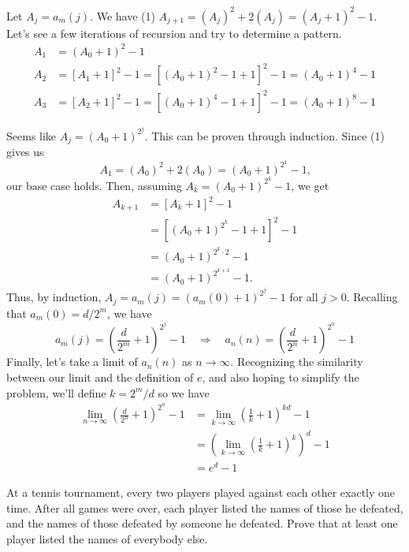 \begin{solution}[$e^d-1$]
    Let $A_j=a_m(j)$. We have (1) $A_{j+1}=(A_j)^2+2(A_j)=(A_j+1)^2-1$. Let's see a few iterations of recursion and try to determine a pattern.
    \begin{align*}
        A_{1} &= (A_0+1)^2-1\\
        A_{2} &= [A_{1}+1]^2-1=\left[(A_0+1)^2-1+1\right]^2-1 = (A_0+1)^4-1\\
        A_{3} &= [A_{2}+1]^2-1=\left[(A_0+1)^4-1+1\right]^2-1 = (A_0+1)^8-1
    \end{align*}\raggedright
    Seems like $\displaystyle A_j=(A_0+1)^{\textstyle 2^j}$. This can be proven through induction. Since (1) gives us
    \[
    A_1=(A_0)^2+2(A_0)=(A_0+1)^{\textstyle 2^1}-1\text{,}
    \]
    our base case holds. Then, assuming $\displaystyle A_k=(A_0+1)^{\textstyle 2^k}-1$, we get 
    \begin{align*}
        A_{k+1} &= [A_k+1]^2-1\\
        &= [(A_0+1)^{\textstyle 2^k}-1+1]^2-1\\
        &=(A_0+1)^{\textstyle 2^k\cdot2}-1\\
        &=(A_0+1)^{\textstyle 2^{k+1}}-1.
    \end{align*}
    Thus, by induction, $A_j=a_m(j)=(a_m(0)+1)^{\textstyle 2^j}-1$ for all $j>0$. Recalling that $a_m(0)=d/2^m$, we have
    \[
    a_m(j)=\left(\frac{d}{2^m}+1\right)^{\textstyle\!2^j}-1 \quad \Rightarrow \quad a_n(n)=\left(\frac{d}{2^n}+1\right)^{\textstyle\!2^n}-1
    \]
    Finally, let's take a limit of $a_n(n)$ as $n\rightarrow\infty$. Recognizing the similarity between our limit and the definition of $e$, and also hoping to simplify the problem, we'll define $k=2^m/d$ so we have
    \begin{align*}
            \lim_{n\rightarrow\infty}{\left(\frac{d}{2^n}+1\right)^{\textstyle\!2^n}-1} &= \lim_{k\rightarrow\infty}{\left(\frac{1}{k}+1\right)^{\textstyle\!kd}-1}\\[1mm]
            &= \left(\lim_{k\rightarrow\infty}\!\left(\frac{1}{k}+1\right)^{\!k}\right)^{\!\!d}-1\\[1mm]
            &= \boxed{e^d-1}
    \end{align*}
\end{solution}

\begin{problem}
    At a tennis tournament, every two players played against each other exactly one time. After all games were over, each player listed the names of those he defeated, and the names of those defeated by someone he defeated. Prove that at least one player listed the names of everybody else.%
\end{problem}

